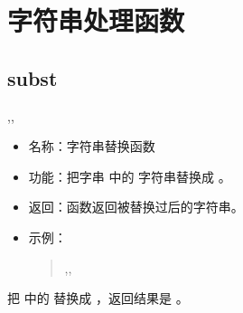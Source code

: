 \documentclass[a4paper,10pt]{sphinxmanual}
\begin{document}
\section{字符串处理函数}
\label{\detokenize{functions:id3}}

\subsection{subst}
\label{\detokenize{functions:subst}}
\begin{sphinxVerbatim}[commandchars=\\\{\}]
 \PYGZlt{}\PYGZgt{},\PYGZlt{}\PYGZgt{},\PYGZlt{}\PYGZgt{}
\end{sphinxVerbatim}
\begin{itemize}
\item {} 
名称：字符串替换函数

\item {} 
功能：把字串  中的  字符串替换成  。

\item {} 
返回：函数返回被替换过后的字符串。

\item {} 
示例：
\begin{quote}

\begin{sphinxVerbatim}[commandchars=\\\{\}]
 ,,   
\end{sphinxVerbatim}
\end{quote}

\end{itemize}

把  中的  替换成  ，返回结果是  。
\end{document}
